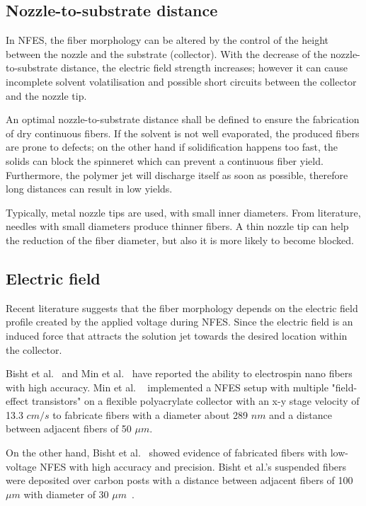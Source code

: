 \documentclass[5p,,preprint,12pt,twocolumn]{elsarticle}
\begin{document}
\subsection{Nozzle-to-substrate distance}In NFES, the fiber morphology can be altered by the control of the height between the nozzle and the substrate (collector). With the decrease of the nozzle-to-substrate distance, the electric field strength increases; however it can cause incomplete solvent volatilisation and possible short circuits between the collector and the nozzle tip.

An optimal nozzle-to-substrate distance shall be defined to ensure the fabrication of dry continuous fibers. If the solvent is not well evaporated, the produced fibers are prone to defects; on the other hand if solidification happens too fast, the solids can block the spinneret which can prevent a continuous fiber yield. Furthermore, the polymer jet will discharge itself as soon as possible, therefore long distances can result in low yields.

Typically, metal nozzle tips are used, with small inner diameters. From literature, needles with small diameters produce thinner fibers. A thin nozzle tip can help the reduction of the fiber diameter, but also it is more likely to become blocked.



\subsection{Electric field}Recent literature suggests that the fiber morphology depends on the electric field profile created by the applied voltage during NFES. Since the electric field is an induced force that attracts the solution jet towards the desired location within the collector.

Bisht et al.\unskip~\cite{527120:11973130} and Min et al.\unskip~\cite{527120:11974316} have reported the ability to electrospin nano fibers with high accuracy. Min et al. \unskip~\cite{527120:11974316} implemented a NFES setup with multiple "field-effect transistors" on a flexible polyacrylate collector with an x-y stage velocity of 13.3 $cm/s $ to fabricate fibers with a diameter about 289 $nm $ and a distance between adjacent fibers of 50 $\mu m $. 

On the other hand, Bisht et al.\unskip~\cite{527120:11973130} showed evidence of fabricated fibers with low-voltage NFES with high accuracy and precision. Bisht et al.'s suspended fibers were deposited over carbon posts with a distance between adjacent fibers of 100 $\mu m $ with diameter of 30 $\mu m $\unskip~\cite{527120:11973130}.
\end{document}
